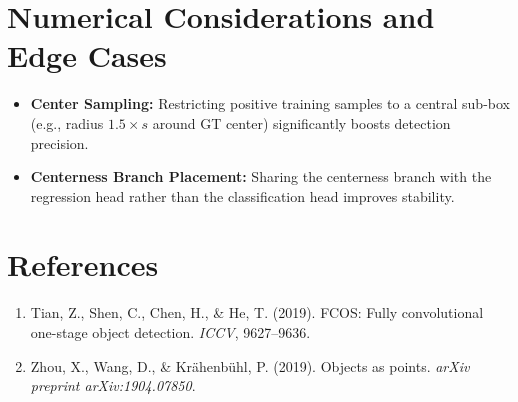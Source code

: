 \documentclass[11pt,a4paper]{article}
\theoremstyle{definition}
\begin{document}
\section{Numerical Considerations and Edge Cases}

\begin{itemize}
    \item \textbf{Center Sampling:} Restricting positive training samples to a central sub-box (e.g., radius $1.5 \times s$ around GT center) significantly boosts detection precision.
    \item \textbf{Centerness Branch Placement:} Sharing the centerness branch with the regression head rather than the classification head improves stability.
\end{itemize}

\section{References}
\begin{enumerate}
    \item Tian, Z., Shen, C., Chen, H., \& He, T. (2019). FCOS: Fully convolutional one-stage object detection. \emph{ICCV}, 9627--9636.
    \item Zhou, X., Wang, D., \& Kr{\"a}henb{\"u}hl, P. (2019). Objects as points. \emph{arXiv preprint arXiv:1904.07850}.
\end{enumerate}
\end{document}
